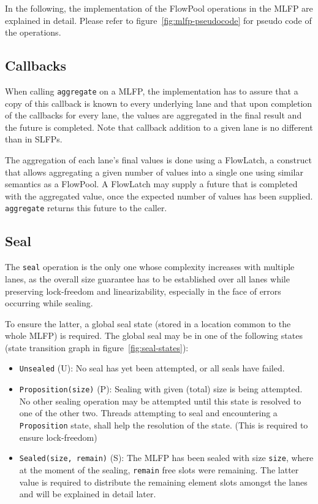 \documentclass[runningheads,a4paper,fleqn]{llncs}
\begin{document}
In the following, the implementation of the FlowPool operations in the
MLFP are explained in detail. Please refer to
figure~\ref{fig:mlfp-pseudocode} for pseudo code of the operations.

\subsection{Callbacks}
When calling \verb+aggregate+ on a MLFP, the implementation has to
assure that a copy of this callback is known to every underlying lane
and that upon completion of the callbacks for every lane, the values
are aggregated in the final result and the future is completed. Note
that callback addition to a given lane is no different than in SLFPs.

The aggregation of each lane's final values is done using a FlowLatch,
a construct that allows aggregating a given number of values into a
single one using similar semantics as a FlowPool. A FlowLatch may
supply a future that is completed with the aggregated value, once the
expected number of values has been supplied. \verb+aggregate+ returns
this future to the caller.

\subsection{Seal}
The \verb+seal+ operation is the only one whose complexity increases
with multiple lanes, as the overall size guarantee has to be
established over all lanes while preserving lock-freedom and
linearizability, especially in the face of errors occurring while
sealing.

To ensure the latter, a global seal state (stored in a location common
to the whole MLFP) is required. The global seal may be in one of the
following states (state transition graph in
figure~\ref{fig:seal-states}):
\begin{itemize}
\item \verb+Unsealed+ (U): No seal has yet been attempted, or all
  seals have failed.
\item \verb+Proposition(size)+ (P): Sealing with given (total) size is
  being attempted. No other sealing operation may be attempted until
  this state is resolved to one of the other two. Threads attempting
  to seal and encountering a \verb+Proposition+ state, shall help the
  resolution of the state. (This is required to ensure lock-freedom)
\item \verb+Sealed(size, remain)+ (S): The MLFP has been sealed with
  size \verb+size+, where at the moment of the sealing, \verb+remain+
  free slots were remaining. The latter value is required to
  distribute the remaining element slots amongst the lanes and will be
  explained in detail later.
\end{itemize}
\end{document}
